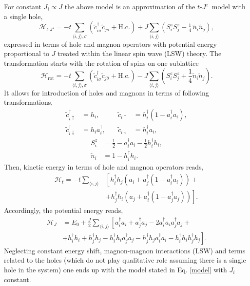 \documentclass[%
 reprint,
 amsmath,amssymb,
 aps,
prb,
floatfix,
]{revtex4-1}
\newcommand{\mean}[1]{\langle#1\rangle}
\begin{document}
For constant $J_i \propto J$ the above model is an approximation of the $t\text{-}J^z$~model with a single hole,
\begin{equation}
\mathcal{H}_{t\text{-}J^z} = -t \sum_{\mean{i,j},\sigma} \left(
\tilde{c}_{i\sigma}^{\dag}\tilde{c}_{j\sigma}^{}\!+\!\mathrm{H.c.}\!\right)
+ J \sum_{\mean{i,j}}\left( S_{i}^{z}S_{j}^{z}\!
-\tfrac14\,\tilde{n}_i\tilde{n}_j\right),
\end{equation}
expressed in terms of hole and magnon operators with potential energy proportional to $J$ treated within the linear spin wave (LSW) theory. The transformation starts with the rotation of spins on one sublattice
\begin{equation}
\mathcal{H}_{\text{rot}} = -t \sum_{\mean{i,j},\sigma} \left( \tilde{c}_{i\sigma}^\dag \tilde{c}_{j\bar{\sigma}} + \text{H.c.} \right) - J \sum_{\mean{i,j}} ( S_i^z S_j^z + \frac{1}{4} \tilde{n}_i \tilde{n}_j ).
\end{equation}
It allows for introduction of holes and magnons in terms of following transformations,
\begin{equation}
\begin{aligned}
\tilde{c}_{i\uparrow}^\dag &= h_i, &\quad \tilde{c}_{i\uparrow} &= h_i^\dag (1 - a_i^\dag a_i), \\
\tilde{c}_{i\downarrow}^\dag &= h_i a_i^\dag, &\quad \tilde{c}_{i\downarrow} &= h_i^\dag a_i,
\end{aligned}
\end{equation}
\begin{equation}
\begin{aligned}
S_i^z &= \frac{1}{2} - a_i^\dag a_i - \frac{1}{2}h_i^\dag h_i, \\
\tilde{n}_i &= 1 - h_i^\dag h_i.
\end{aligned}
\end{equation}
Then, kinetic energy in terms of hole and magnon operators reads,
\begin{equation}
\begin{aligned}
\mathcal{H}_t = -t \sum_{\mean{i,j}} &\left[ h_i^\dag h_j \left( a_i + a_j^\dag (1 -  a_i^\dag a_i) \right)\right. + \\
&+ \left. h_j^\dag h_i \left( a_j + a_i^\dag (1 -  a_j^\dag a_j) \right)\right].
\end{aligned}
\end{equation}
Accordingly, the potential energy reads,
\begin{equation}
\begin{aligned}
\mathcal{H}_J &= E_0 + \frac{J}{2} \sum_{\mean{i,j}} \left[ a_i^\dag a_i + a_j^\dag a_j - 2 a_i^\dag a_i a_j^\dag a_j \right. + \\
&+\left. h_i^\dag h_i + h_j^\dag h_j - h_i^\dag h_i a_j^\dag a_j - h_j^\dag h_j a_i^\dag a_i - h_i^\dag h_i h_j^\dag h_j \right].
\end{aligned}
\end{equation}
Neglecting constant energy shift, magnon-magnon interactions (LSW) and terms related to the holes (which do not play qualitative role assuming there is a single hole in the system) one ends up with the model stated in Eq. \ref{model} with $J_i$ constant.
\end{document}
